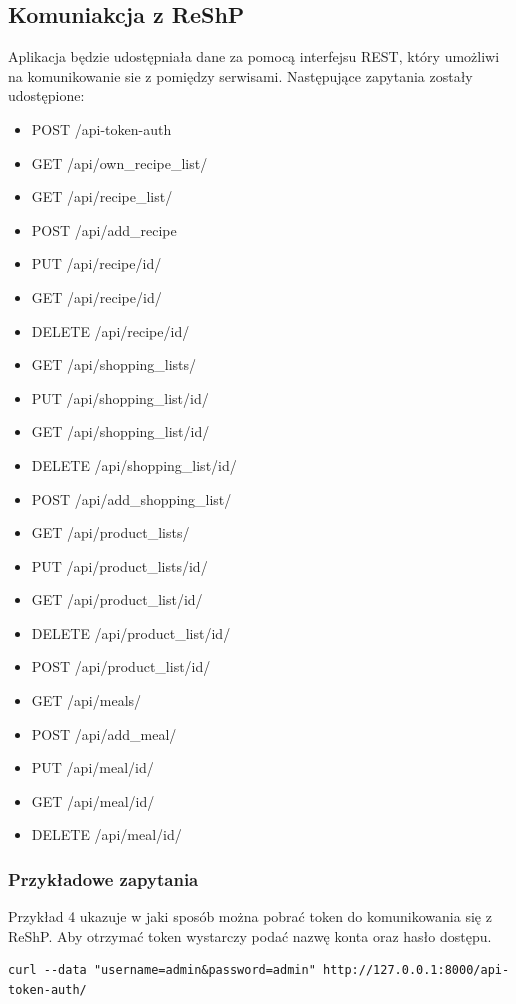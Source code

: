 \documentclass{article}
\begin{document}
\subsection{Komuniakcja z ReShP}
Aplikacja będzie udostępniała dane za pomocą interfejsu REST, który umożliwi na komunikowanie sie z pomiędzy serwisami. Następujące zapytania zostały udostępione:
\begin{itemize}
\item POST /api-token-auth
\item GET /api/own\_recipe\_list/
\item GET /api/recipe\_list/
\item POST /api/add\_recipe
\item PUT /api/recipe/{id}/
\item GET /api/recipe/{id}/
\item DELETE /api/recipe/{id}/
\item GET /api/shopping\_lists/
\item PUT /api/shopping\_list/{id}/
\item GET /api/shopping\_list/{id}/
\item DELETE /api/shopping\_list/{id}/
\item POST /api/add\_shopping\_list/
\item GET /api/product\_lists/
\item PUT /api/product\_lists/{id}/
\item GET /api/product\_list/{id}/
\item DELETE /api/product\_list/{id}/
\item POST /api/product\_list/{id}/
\item GET /api/meals/
\item POST /api/add\_meal/
\item PUT /api/meal/{id}/
\item GET /api/meal/{id}/
\item DELETE /api/meal/{id}/
\end{itemize}

\subsubsection{Przykładowe zapytania}
Przykład 4 ukazuje w jaki sposób można pobrać token do komunikowania się z ReShP. Aby otrzymać token wystarczy podać nazwę konta oraz hasło dostępu.

\begin{lstlisting}[label=token_api,caption=Pobieranie tokenu,breaklines=true]
curl --data "username=admin&password=admin" http://127.0.0.1:8000/api-token-auth/
\end{lstlisting}
\end{document}
